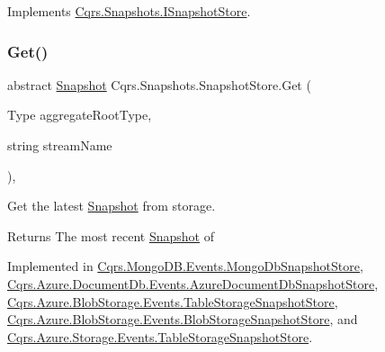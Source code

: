 Implements \hyperlink{interfaceCqrs_1_1Snapshots_1_1ISnapshotStore_a25efb06a4a6fcc9246d4572777c95dd5_a25efb06a4a6fcc9246d4572777c95dd5}{Cqrs.\+Snapshots.\+I\+Snapshot\+Store}.

\mbox{\label{classCqrs_1_1Snapshots_1_1SnapshotStore_ab2ecab1a665c0f2097929d028fe4ac69_ab2ecab1a665c0f2097929d028fe4ac69}} 
\subsubsection{\texorpdfstring{Get()}{Get()}\hspace{0.1cm}{\footnotesize\ttfamily [2/2]}}
{\footnotesize\ttfamily abstract \hyperlink{classCqrs_1_1Snapshots_1_1Snapshot}{Snapshot} Cqrs.\+Snapshots.\+Snapshot\+Store.\+Get (\begin{DoxyParamCaption}\item[{Type}]{aggregate\+Root\+Type,  }\item[{string}]{stream\+Name }\end{DoxyParamCaption})\hspace{0.3cm}{\ttfamily [protected]}, {}}



Get the latest \hyperlink{classCqrs_1_1Snapshots_1_1Snapshot}{Snapshot} from storage. 

\begin{DoxyReturn}{Returns}
The most recent \hyperlink{classCqrs_1_1Snapshots_1_1Snapshot}{Snapshot} of
\end{DoxyReturn}


Implemented in \hyperlink{classCqrs_1_1MongoDB_1_1Events_1_1MongoDbSnapshotStore_acb01680aad8c2671206bc851da17a036_acb01680aad8c2671206bc851da17a036}{Cqrs.\+Mongo\+D\+B.\+Events.\+Mongo\+Db\+Snapshot\+Store}, \hyperlink{classCqrs_1_1Azure_1_1DocumentDb_1_1Events_1_1AzureDocumentDbSnapshotStore_ac924659cdf14b06e31c57e4b1107b739_ac924659cdf14b06e31c57e4b1107b739}{Cqrs.\+Azure.\+Document\+Db.\+Events.\+Azure\+Document\+Db\+Snapshot\+Store}, \hyperlink{classCqrs_1_1Azure_1_1BlobStorage_1_1Events_1_1TableStorageSnapshotStore_a169361a7fbf413fed660609f66d95e13_a169361a7fbf413fed660609f66d95e13}{Cqrs.\+Azure.\+Blob\+Storage.\+Events.\+Table\+Storage\+Snapshot\+Store}, \hyperlink{classCqrs_1_1Azure_1_1BlobStorage_1_1Events_1_1BlobStorageSnapshotStore_a0d5d8af1e7e243d05ccc064b532bee2b_a0d5d8af1e7e243d05ccc064b532bee2b}{Cqrs.\+Azure.\+Blob\+Storage.\+Events.\+Blob\+Storage\+Snapshot\+Store}, and \hyperlink{classCqrs_1_1Azure_1_1Storage_1_1Events_1_1TableStorageSnapshotStore_ac552ed9e69ca9ce8bbd9f14b4ecb546f_ac552ed9e69ca9ce8bbd9f14b4ecb546f}{Cqrs.\+Azure.\+Storage.\+Events.\+Table\+Storage\+Snapshot\+Store}.

